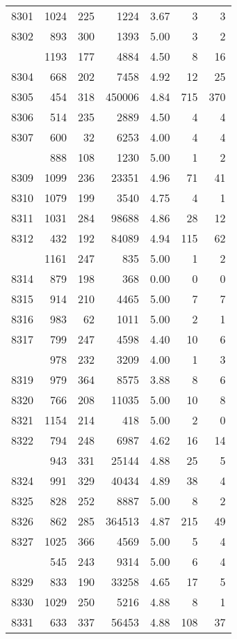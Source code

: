 \documentclass[
]{article}
\begin{document}
\begin{table}
\begin{tabular}[t]{lrrrrrr}
8301 & 1024 & 225 & 1224 & 3.67 & 3 & 3\\
8302 & 893 & 300 & 1393 & 5.00 & 3 & 2\\
\addlinespace
8303 & 1193 & 177 & 4884 & 4.50 & 8 & 16\\
8304 & 668 & 202 & 7458 & 4.92 & 12 & 25\\
8305 & 454 & 318 & 450006 & 4.84 & 715 & 370\\
8306 & 514 & 235 & 2889 & 4.50 & 4 & 4\\
8307 & 600 & 32 & 6253 & 4.00 & 4 & 4\\
\addlinespace
8308 & 888 & 108 & 1230 & 5.00 & 1 & 2\\
8309 & 1099 & 236 & 23351 & 4.96 & 71 & 41\\
8310 & 1079 & 199 & 3540 & 4.75 & 4 & 1\\
8311 & 1031 & 284 & 98688 & 4.86 & 28 & 12\\
8312 & 432 & 192 & 84089 & 4.94 & 115 & 62\\
\addlinespace
8313 & 1161 & 247 & 835 & 5.00 & 1 & 2\\
8314 & 879 & 198 & 368 & 0.00 & 0 & 0\\
8315 & 914 & 210 & 4465 & 5.00 & 7 & 7\\
8316 & 983 & 62 & 1011 & 5.00 & 2 & 1\\
8317 & 799 & 247 & 4598 & 4.40 & 10 & 6\\
\addlinespace
8318 & 978 & 232 & 3209 & 4.00 & 1 & 3\\
8319 & 979 & 364 & 8575 & 3.88 & 8 & 6\\
8320 & 766 & 208 & 11035 & 5.00 & 10 & 8\\
8321 & 1154 & 214 & 418 & 5.00 & 2 & 0\\
8322 & 794 & 248 & 6987 & 4.62 & 16 & 14\\
\addlinespace
8323 & 943 & 331 & 25144 & 4.88 & 25 & 5\\
8324 & 991 & 329 & 40434 & 4.89 & 38 & 4\\
8325 & 828 & 252 & 8887 & 5.00 & 8 & 2\\
8326 & 862 & 285 & 364513 & 4.87 & 215 & 49\\
8327 & 1025 & 366 & 4569 & 5.00 & 5 & 4\\
\addlinespace
8328 & 545 & 243 & 9314 & 5.00 & 6 & 4\\
8329 & 833 & 190 & 33258 & 4.65 & 17 & 5\\
8330 & 1029 & 250 & 5216 & 4.88 & 8 & 1\\
8331 & 633 & 337 & 56453 & 4.88 & 108 & 37\\

\end{tabular}
\end{table}
\end{document}
